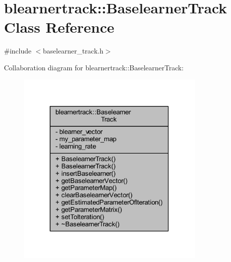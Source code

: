 \hypertarget{classblearnertrack_1_1_baselearner_track}{}\section{blearnertrack\+:\+:Baselearner\+Track Class Reference}
\label{classblearnertrack_1_1_baselearner_track}


{\ttfamily \#include $<$baselearner\+\_\+track.\+h$>$}



Collaboration diagram for blearnertrack\+:\+:Baselearner\+Track\+:\nopagebreak
\begin{figure}[H]
\begin{center}
\leavevmode
\includegraphics[width=259pt]{classblearnertrack_1_1_baselearner_track__coll__graph}
\end{center}
\end{figure}
